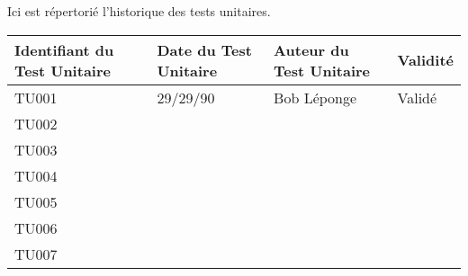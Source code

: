 
Ici est répertorié l'historique des tests unitaires. \\

\begin{table}[H]
\centering
	\begin{tabularx}{17.4cm}{|X|X|X|X|}
	\hline
	\rowcolor{gray!40} Identifiant du Test Unitaire & Date du Test Unitaire & Auteur du Test Unitaire & Validité\\
	\hline
	 TU001 & 29/29/90 & Bob Léponge & Validé \\
	\hline
	 TU002 & & & \\
	 \hline
	 TU003 & & & \\
	 \hline
	 TU004 & & & \\
	 \hline 
	 TU005 & & & \\
	 \hline
	 TU006 & & & \\
	 \hline
	 TU007 & & & \\
	 \hline
	\end{tabularx}
\end{table}

